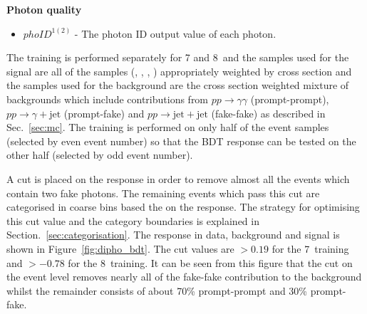 \noindent\textbf{Photon quality}
\begin{itemize}
  \item $phoID^{1(2)}$ - The photon ID \BDT output value of each photon.
\end{itemize}

The training is performed separately for 7 and 8~\TeV and the samples used for the signal are all of the \SM \Hgg \MC samples (\ggH, \VBF, \VH, \ttH) appropriately weighted by cross section and the samples used for the background are the cross section weighted mixture of \SM backgrounds which include contributions from $pp\rightarrow\gamma\gamma$ (prompt-prompt), $pp\rightarrow\gamma+\mathrm{jet}$ (prompt-fake) and $pp\rightarrow\mathrm{jet+jet}$ (fake-fake) as described in Sec.~\ref{sec:mc}. The training is performed on only half of the event samples (selected by even event number) so that the BDT response can be tested on the other half (selected by odd event number).

A cut is placed on the \BDT response in order to remove almost all the events which contain two fake photons. The remaining events which pass this cut are categorised in coarse bins based the on the \BDT response. The strategy for optimising this cut value and the category boundaries is explained in Section.~\ref{sec:categorisation}. The \BDT response in data, background and signal is shown in Figure~\ref{fig:dipho_bdt}. The cut values are $>0.19$ for the 7~\TeV training and $>-0.78$ for the 8~\TeV training. It can be seen from this figure that the cut on the event level \BDT removes nearly all of the fake-fake contribution to the background whilst the remainder consists of about 70\% prompt-prompt and 30\% prompt-fake.

